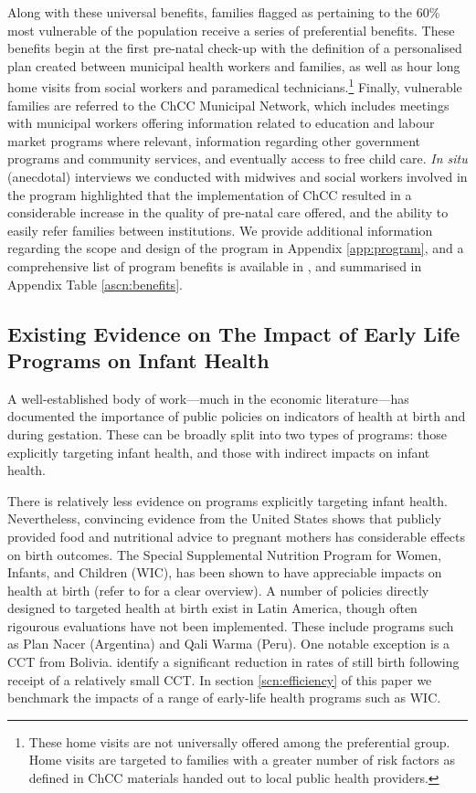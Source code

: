 \documentclass[12pt]{article}
\begin{document}
\begin{spacing}{1.4}
Along with these universal benefits, families flagged as 
pertaining to the 60\% most vulnerable of the population receive a
series of preferential benefits.  These benefits begin at the
first pre-natal check-up with the definition of a personalised
plan created between municipal health workers and families, as
well as hour long home visits from social workers and paramedical
technicians.\footnote{These home visits are not universally
  offered among the preferential group.  Home visits are targeted
  to families with a greater number of risk factors as defined in
  ChCC materials handed out to local public health providers.} Finally,
vulnerable families are referred to the ChCC Municipal Network,
which includes meetings with municipal workers offering information
related to education and labour market programs where relevant,
information regarding other government programs and community
services, and eventually access to free child care. \emph{In situ}
(anecdotal) interviews we conducted with midwives and social workers
involved in the program highlighted that the implementation
of ChCC resulted in a considerable increase in the quality of
pre-natal care offered, and the ability to easily refer families
between institutions.  We provide additional information regarding
the scope and design of the program in Appendix \ref{app:program},
and a comprehensive list of program benefits is available in
\citet{MDS2014}, and summarised in Appendix Table \ref{ascn:benefits}.

\subsection{Existing Evidence on The Impact of Early Life Programs on Infant Health}
A well-established body of work---much in the economic
literature---has documented the importance of public policies
on indicators of health at birth and during gestation.  These
can be broadly split into two types of programs: those explicitly
targeting infant health, and those with indirect impacts on
infant health.

There is relatively less evidence on programs explicitly
targeting infant health. Nevertheless, convincing evidence
from the United States shows that publicly provided food and
nutritional advice to pregnant mothers has considerable effects
on birth outcomes.  The Special Supplemental Nutrition Program
for Women, Infants, and Children (WIC), has been shown to have
appreciable impacts on health at birth (refer to
\citet{BitlerKaroly2015} for a clear overview).  A number of
policies directly designed to targeted health at birth exist
in Latin America, though often rigourous evaluations have not
been implemented. These include programs such as Plan Nacer
(Argentina) and Qali Warma (Peru).  One notable exception is
a CCT from Bolivia.  \citet{Celhayetal2016} identify a significant
reduction in rates of still birth following receipt of a relatively
small CCT.  In section \ref{scn:efficiency} of this paper we benchmark
the impacts of a range of early-life health programs such as WIC.


\end{spacing}
\end{document}
